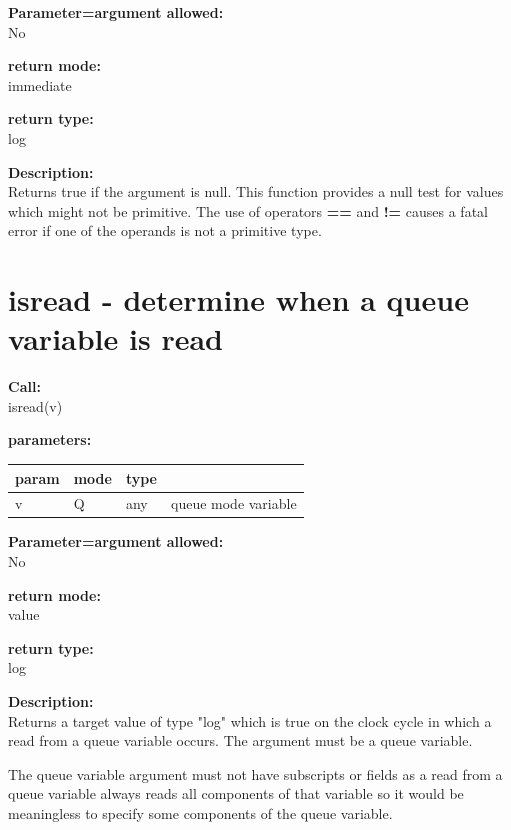         {\bf Parameter=argument allowed:} \\
        No
        
        {\bf return mode:} \\
        immediate

        {\bf return type:} \\
        log
        
        {\bf Description:} \\
        Returns true if the argument is null. This function provides a
        null test for values which might not be primitive. The use of
        operators {\bf ==} and {\bf !=} causes a fatal error if one of
        the operands is not a primitive type.
       

    \section{isread - determine when a queue variable is read}\label{sec:ifisread}
        
        {\bf Call:} \\
        isread(v)
        
        {\bf parameters:} \\
        \begin{tabular}{| l | l | l | l |}
        \hline
        param  & mode & type & \\
        \hline \hline
        v & Q & any & queue mode variable \\ \hline
        \end{tabular}
        
        {\bf Parameter=argument allowed:} \\
        No
        
        {\bf return mode:} \\
        value

        {\bf return type:} \\
        log
        
        {\bf Description:} \\
        Returns a target value of type "log" which is true on the clock cycle in
        which a read from a queue variable occurs. The argument must be a queue variable.
        
        The queue variable argument must not have subscripts or fields as a read
        from a queue variable always reads all components of that variable so
        it would be meaningless to specify some components of the queue variable.
        
